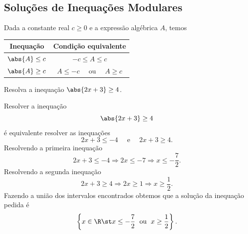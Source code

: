 \subsection{Soluções de Inequações Modulares}

Dada a constante real $c \geq 0$ e a expressão algébrica $A$, temos
\begin{center}
  \vspace{-0.5\baselineskip}
  \begin{tabular}{c<{\;}>{\;}c}
    \hline
     Inequação        & Condição equivalente                          \\ \hline
    \(\abs{A}\leq c\) & \(-c \leq A \leq c\)                          \\
    \(\abs{A}\geq c\) & \( A \leq -c \quad\text{ ou }\quad A \geq c\) \\ \hline
  \end{tabular}
\end{center}

\begin{example}
  Resolva a inequação \(\abs{2x+3} \geq 4\).

  \solution
    Resolver a inequação
    \[
      \abs{2x+3} \geq 4
    \]
    é equivalente resolver as inequações
    \[
      2x+3 \leq -4
      \quad\text{ e }\quad
      2x+3 \geq 4.
    \]
    Resolvendo a primeira inequação
    \[
      2x+3 \leq -4 \Rightarrow 2x \leq -7 \Rightarrow x  \leq -\frac{7}{2}.
    \]
    Resolvendo a segunda inequação
    \[
      2x+3 \geq 4 \Rightarrow 2x \geq 1 \Rightarrow x \geq \frac{1}{2}.
    \]
    Fazendo a união dos intervalos encontrados obtemos que a solução da
    inequação pedida é
    \[
      \left\{ x \in \R \st
              x \leq -\frac{7}{2}
              \;\text{ ou }\;
              x \geq \frac{1}{2}
      \right\}.
    \]
\end{example}


